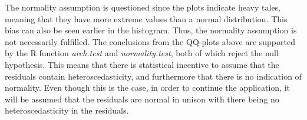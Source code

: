 \noindent The normality assumption is questioned since the plots indicate heavy tales, meaning that they have more extreme values than a normal distribution. This bias can also be seen earlier in the histogram. Thus, the normality assumption is not necessarily fulfilled. The conclusions from the QQ-plots above are supported by the R function \textit{arch.test} and \textit{normality.test}, both of which reject the null hypothesis. This means that there is statistical incentive to assume that the residuals contain heteroscedasticity, and furthermore that there is no indication of normality. Even though this is the case, in order to continue the application, it will be assumed that the residuals are normal in unison with there being no heteroscedasticity in the residuals.